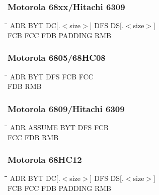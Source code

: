 \subsubsection{Motorola 68xx/Hitachi 6309}
{\tt\begin{tabbing}
\hspace{3cm}\=\hspace{3cm}\=\hspace{3cm}\=\hspace{3cm}\=\kill
ADR        \> BYT         \> DC[.$<$size$>$] \> DFS     \> DS[.$<$size$>$] \\
FCB        \> FCC         \> FDB         \> PADDING     \> RMB \\
\end{tabbing}}

\subsubsection{Motorola 6805/68HC08}
{\tt\begin{tabbing}
\hspace{3cm}\=\hspace{3cm}\=\hspace{3cm}\=\hspace{3cm}\=\kill
ADR        \> BYT         \> DFS         \> FCB         \> FCC \\
FDB        \> RMB \\
\end{tabbing}}

\subsubsection{Motorola 6809/Hitachi 6309}
{\tt\begin{tabbing}
\hspace{3cm}\=\hspace{3cm}\=\hspace{3cm}\=\hspace{3cm}\=\kill
ADR        \> ASSUME      \> BYT         \> DFS         \> FCB \\
FCC        \> FDB         \> RMB \\
\end{tabbing}}

\subsubsection{Motorola 68HC12}
{\tt\begin{tabbing}
\hspace{3cm}\=\hspace{3cm}\=\hspace{3cm}\=\hspace{3cm}\=\kill
ADR        \> BYT         \> DC[.$<$size$>$] \> DFS     \> DS[.$<$size$>$] \\
FCB        \> FCC         \> FDB         \> PADDING     \> RMB \\
\end{tabbing}}

